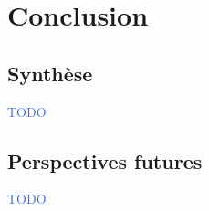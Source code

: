\documentclass[../main.tex]{subfiles}
\begin{document}
\section{Conclusion}

\subsection{Synthèse}

\begin{frame}{\secname}
  \begin{center}
    \textcolor{RoyalBlue}{TODO}
  \end{center}
\end{frame}

\subsection{Perspectives futures}

\begin{frame}{\secname}
  \begin{center}
    \textcolor{RoyalBlue}{TODO}
  \end{center}
\end{frame}
\end{document}
